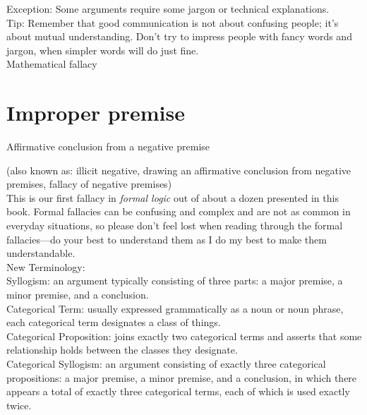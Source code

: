 \documentclass[a4paper,12pt,single,pdftex]{scrbook}
\begin{document}
    
      Exception: Some arguments require some jargon or technical explanations.
    \\

    
      Tip: Remember that good communication is not about confusing people; it’s about mutual understanding.  Don’t try to impress people with fancy words and jargon, when simpler words will do just fine.
    \\

  

Mathematical fallacy\section{Improper premise}


Affirmative conclusion from a negative premise
    
      (also known as: illicit negative, drawing an affirmative conclusion from negative premises, fallacy of negative premises)
    \\

  
    
      This is our first fallacy in {\it formal logic} out of about a dozen presented in this book.  Formal fallacies can be confusing and complex and are not as common in everyday situations, so please don’t feel lost when reading through the formal fallacies—do your best to understand them as I do my best to make them understandable.
    \\

    
      New Terminology:
    \\

    
      Syllogism: an argument typically consisting of three parts: a major premise, a minor premise, and a conclusion.
    \\

    
      Categorical Term: usually expressed grammatically as a noun or noun phrase, each categorical term designates a class of things.
    \\

    
      Categorical Proposition: joins exactly two categorical terms and asserts that some relationship holds between the classes they designate.
    \\

    
      Categorical Syllogism: an argument consisting of exactly three categorical propositions: a major premise, a minor premise, and a conclusion, in which there appears a total of exactly three categorical terms, each of which is used exactly twice.
    \\
\end{document}
